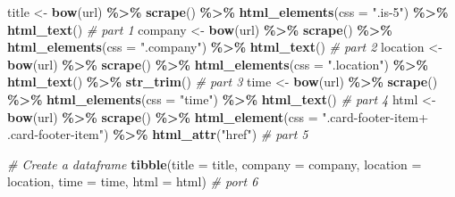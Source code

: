 \documentclass[
]{book}
\newenvironment{Shaded}{\begin{snugshade}}{\end{snugshade}}
\newcommand{\AttributeTok}[1]{\textcolor[rgb]{0.13,0.29,0.53}{#1}}
\newcommand{\CommentTok}[1]{\textcolor[rgb]{0.56,0.35,0.01}{\textit{#1}}}
\newcommand{\FunctionTok}[1]{\textcolor[rgb]{0.13,0.29,0.53}{\textbf{#1}}}
\newcommand{\NormalTok}[1]{#1}
\newcommand{\OtherTok}[1]{\textcolor[rgb]{0.56,0.35,0.01}{#1}}
\newcommand{\SpecialCharTok}[1]{\textcolor[rgb]{0.81,0.36,0.00}{\textbf{#1}}}
\newcommand{\StringTok}[1]{\textcolor[rgb]{0.31,0.60,0.02}{#1}}
\begin{document}
\begin{Shaded}
\begin{Highlighting}[]
\NormalTok{title }\OtherTok{\textless{}{-}} \FunctionTok{bow}\NormalTok{(url) }\SpecialCharTok{\%\textgreater{}\%} \FunctionTok{scrape}\NormalTok{() }\SpecialCharTok{\%\textgreater{}\%} \FunctionTok{html\_elements}\NormalTok{(}\AttributeTok{css =} \StringTok{".is{-}5"}\NormalTok{) }\SpecialCharTok{\%\textgreater{}\%} \FunctionTok{html\_text}\NormalTok{()   }\CommentTok{\# part 1}
\NormalTok{company }\OtherTok{\textless{}{-}} \FunctionTok{bow}\NormalTok{(url) }\SpecialCharTok{\%\textgreater{}\%} \FunctionTok{scrape}\NormalTok{() }\SpecialCharTok{\%\textgreater{}\%} \FunctionTok{html\_elements}\NormalTok{(}\AttributeTok{css =} \StringTok{".company"}\NormalTok{) }\SpecialCharTok{\%\textgreater{}\%} \FunctionTok{html\_text}\NormalTok{() }\CommentTok{\# part 2}
\NormalTok{location }\OtherTok{\textless{}{-}} \FunctionTok{bow}\NormalTok{(url) }\SpecialCharTok{\%\textgreater{}\%} \FunctionTok{scrape}\NormalTok{() }\SpecialCharTok{\%\textgreater{}\%} \FunctionTok{html\_elements}\NormalTok{(}\AttributeTok{css =} \StringTok{".location"}\NormalTok{) }\SpecialCharTok{\%\textgreater{}\%} \FunctionTok{html\_text}\NormalTok{() }\SpecialCharTok{\%\textgreater{}\%} \FunctionTok{str\_trim}\NormalTok{() }\CommentTok{\# part 3}
\NormalTok{time }\OtherTok{\textless{}{-}} \FunctionTok{bow}\NormalTok{(url) }\SpecialCharTok{\%\textgreater{}\%} \FunctionTok{scrape}\NormalTok{() }\SpecialCharTok{\%\textgreater{}\%} \FunctionTok{html\_elements}\NormalTok{(}\AttributeTok{css =} \StringTok{"time"}\NormalTok{) }\SpecialCharTok{\%\textgreater{}\%} \FunctionTok{html\_text}\NormalTok{() }\CommentTok{\# part 4}
\NormalTok{html }\OtherTok{\textless{}{-}} \FunctionTok{bow}\NormalTok{(url) }\SpecialCharTok{\%\textgreater{}\%} \FunctionTok{scrape}\NormalTok{() }\SpecialCharTok{\%\textgreater{}\%}  \FunctionTok{html\_element}\NormalTok{(}\AttributeTok{css =} \StringTok{".card{-}footer{-}item+ .card{-}footer{-}item"}\NormalTok{) }\SpecialCharTok{\%\textgreater{}\%} \FunctionTok{html\_attr}\NormalTok{(}\StringTok{"href"}\NormalTok{)  }\CommentTok{\# part 5}

\CommentTok{\# Create a dataframe}
\FunctionTok{tibble}\NormalTok{(}\AttributeTok{title =}\NormalTok{ title, }\AttributeTok{company =}\NormalTok{ company, }\AttributeTok{location =}\NormalTok{ location, }\AttributeTok{time =}\NormalTok{ time, }\AttributeTok{html =}\NormalTok{ html) }\CommentTok{\# port 6}
\end{Highlighting}
\end{Shaded}
\end{document}
